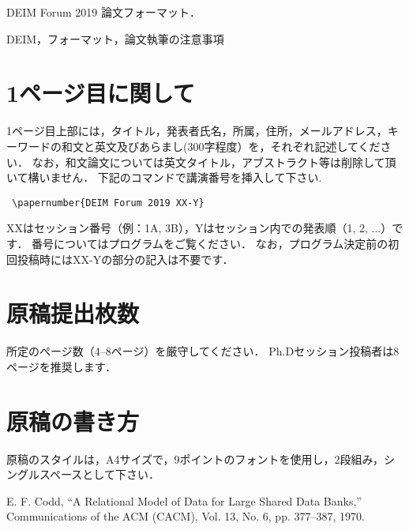 \documentclass{deimj}
\begin{document}
\pagestyle{empty}
\begin{jabstract}
DEIM Forum 2019 論文フォーマット．
\end{jabstract}
\begin{jkeyword}
DEIM，フォーマット，論文執筆の注意事項
\end{jkeyword}
\maketitle

\section{1ページ目に関して}

1ページ目上部には，タイトル，発表者氏名，所属，住所，メールアドレス，キーワードの和文と英文及びあらまし(300字程度）を，それぞれ記述してください．
なお，和文論文については英文タイトル，アブストラクト等は削除して頂いて構いません．
下記のコマンドで講演番号を挿入して下さい.
\begin{verbatim}
 \papernumber{DEIM Forum 2019 XX-Y}
\end{verbatim}
XXはセッション番号（例：1A, 3B），Yはセッション内での発表順（1, 2, ...）です．
番号についてはプログラムをご覧ください．
なお，プログラム決定前の初回投稿時にはXX-Yの部分の記入は不要です．

\section{原稿提出枚数}

所定のページ数（4--8ページ）を厳守してください．
Ph.Dセッション投稿者は8ページを推奨します．

\section{原稿の書き方}

原稿のスタイルは，A4サイズで，9ポイントのフォントを使用し，2段組み，シングルスペースとして下さい．

\vspace{2em}

\begin{thebibliography}{99}
  E. F. Codd, 
  ``A Relational Model of Data for Large Shared Data Banks,''
  Communications of the {ACM} (CACM), Vol. 13, No. 6, pp. 377--387, 1970.
\end{thebibliography}
\end{document}
